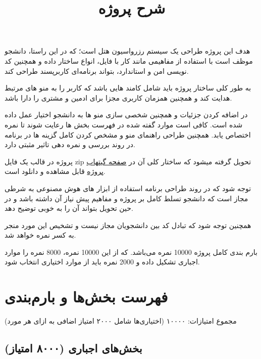 

\title{شرح پروژه}
\author{}
\date{}
\maketitle

\begin{spacing}
\setlength{\parindent}{0.2cm}

هدف این پروژه طراحی یک سیستم رزرواسیون هتل است؛ که در این راستا، دانشجو موظف است با استفاده از مفاهیمی مانند کار با فایل، انواع ساختار داده و همچنین کد نویسی امن و استاندارد، بتواند برنامه‌ای کاربرپسند طراحی کند.

به طور کلی ساختار پروژه باید شامل کامند هایی باشد که کاربر را به منو های مرتبط هدایت کند و همچنین همزمان کاربری مجزا برای ادمین و مشتری را دارا باشد.

در اضافه کردن جزئیات و همچنین شخصی سازی منو ها به دانشجو اختیار عمل داده شده است. کافی است موارد گفته شده در فهرست بخش ها رعایت شوند تا نمره اختصاص یابد. همچنین طراحی راهنمای منو و مشخص کردن کامل گزینه ها در برنامه در روند بررسی و نمره دهی تاثیر مثبتی دارد.

پروژه در قالب یک فایل zip تحویل گرفته میشود که ساختار کلی آن در 
\href{https://github.com/LuChristCho/FOP-S25-C-FinalProject-SUT}{صفحه گیتهاب پروژه}
قابل مشاهده و دانلود است.

توجه شود که در روند طراحی برنامه استفاده از ابزار های هوش مصنوعی به شرطی مجاز است که دانشجو تسلط کامل بر پروژه و مفاهیم پیش نیاز آن داشته باشد و در حین تحویل بتواند آن را به خوبی توضیح دهد.

همچنین توجه شود که تبادل کد بین دانشجویان مجاز نیست و تشخیص این مورد منجر به کسر نمره خواهد شد.

بارم بندی کامل پروژه 10000 نمره می‌باشد. که از این 10000 نمره، 8000 نمره را موارد اجباری تشکیل داده و 2000 نمره باید از موارد اختیاری انتخاب شود.

\end{spacing}

\vspace{7cm}

\section*{فهرست بخش‌ها و بارم‌بندی}
مجموع امتیازات: ۱۰۰۰۰ (اختیاری‌ها شامل ۲۰۰۰ امتیاز اضافی به ازای هر مورد)

\subsection*{بخش‌های اجباری (۸۰۰۰ امتیاز)}
